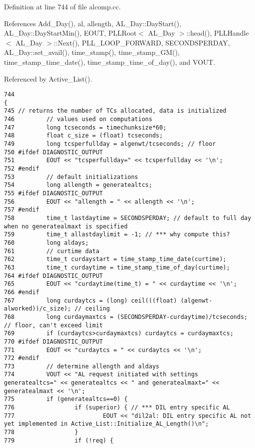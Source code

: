 Definition at line 744 of file alcomp.cc.

References Add\_\-Day(), al, allength, AL\_\-Day::Day\-Start(), AL\_\-Day::Day\-Start\-Min(), EOUT, PLLRoot$<$ AL\_\-Day $>$::head(), PLLHandle$<$ AL\_\-Day $>$::Next(), PLL\_\-LOOP\_\-FORWARD, SECONDSPERDAY, AL\_\-Day::set\_\-avail(), time\_\-stamp(), time\_\-stamp\_\-GM(), time\_\-stamp\_\-time\_\-date(), time\_\-stamp\_\-time\_\-of\_\-day(), and VOUT.

Referenced by Active\_\-List().



\footnotesize\begin{verbatim}744                                                                                                            {
745 // returns the number of TCs allocated, data is initialized
746         // values used on computations
747         long tcseconds = timechunksize*60;
748         float c_size = (float) tcseconds;
749         long tcsperfullday = algenwt/tcseconds; // floor
750 #ifdef DIAGNOSTIC_OUTPUT
751         EOUT << "tcsperfullday=" << tcsperfullday << '\n';
752 #endif
753         // default initializations
754         long allength = generatealtcs;
755 #ifdef DIAGNOSTIC_OUTPUT
756         EOUT << "allength = " << allength << '\n';
757 #endif
758         time_t lastdaytime = SECONDSPERDAY; // default to full day when no generatealmaxt is specified
759         time_t allastdaylimit = -1; // *** why compute this?
760         long aldays;
761         // curtime data
762         time_t curdaystart = time_stamp_time_date(curtime);
763         time_t curdaytime = time_stamp_time_of_day(curtime);
764 #ifdef DIAGNOSTIC_OUTPUT
765         EOUT << "curdaytime(time_t) = " << curdaytime << '\n';
766 #endif
767         long curdaytcs = (long) ceil(((float) (algenwt-alworked))/c_size); // ceiling
768         long curdaymaxtcs = (SECONDSPERDAY-curdaytime)/tcseconds; // floor, can't exceed limit
769         if (curdaytcs>curdaymaxtcs) curdaytcs = curdaymaxtcs;
770 #ifdef DIAGNOSTIC_OUTPUT
771         EOUT << "curdaytcs = " << curdaytcs << '\n';
772 #endif
773         // determine allength and aldays
774         VOUT << "AL request initiated with settings generatealtcs=" << generatealtcs << " and generatealmaxt=" << generatealmaxt << '\n';
775         if (generatealtcs==0) {
776                 if (superior) { // *** DIL entry specific AL
777                         EOUT << "dil2al: DIL entry specific AL not yet implemented in Active_List::Initialize_AL_Length()\n";
778                 }
779                 if (!req) {

\end{verbatim}
